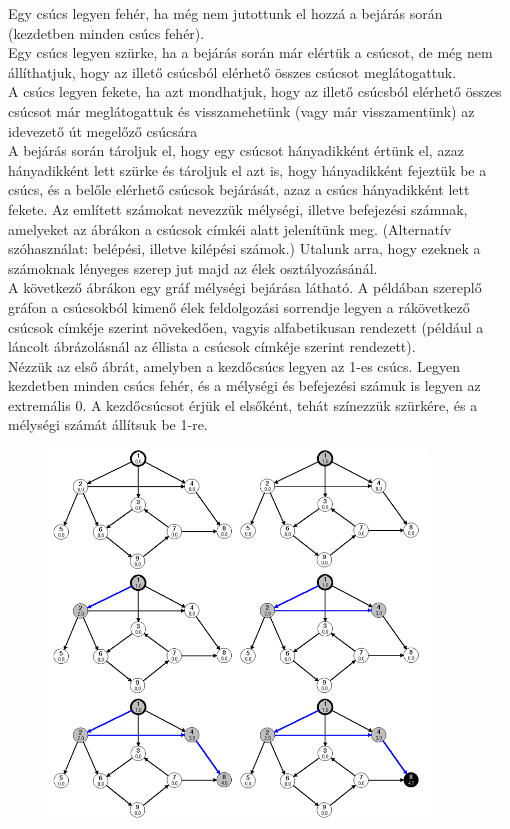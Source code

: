\documentclass[margin=0px]{article}
\begin{document}
    \noindent Egy csúcs legyen fehér, ha még nem jutottunk el hozzá a bejárás során (kezdetben minden csúcs fehér).\\
    \noindent Egy csúcs legyen szürke, ha a bejárás során már elértük a csúcsot, de még nem állíthatjuk, hogy az illető csúcsból elérhető összes csúcsot meglátogattuk.\\
    \noindent A csúcs legyen fekete, ha azt mondhatjuk, hogy az illető csúcsból elérhető összes csúcsot már meglátogattuk és visszamehetünk (vagy már visszamentünk) az idevezető út megelőző csúcsára\\

    \noindent A bejárás során tároljuk el, hogy egy csúcsot hányadikként értünk el, azaz hányadikként lett szürke és tároljuk el azt is, hogy hányadikként fejeztük be a csúcs, és a belőle elérhető csúcsok bejárását, azaz a csúcs hányadikként lett fekete. Az említett számokat nevezzük mélységi, illetve befejezési számnak, amelyeket az ábrákon a csúcsok címkéi alatt jelenítünk meg. (Alternatív szóhasználat: belépési, illetve kilépési számok.) Utalunk arra, hogy ezeknek a számoknak lényeges szerep jut majd az élek osztályozásánál.\\

    \noindent A következő ábrákon egy gráf mélységi bejárása látható. A példában szereplő gráfon a csúcsokból kimenő élek feldolgozási sorrendje legyen a rákövetkező csúcsok címkéje szerint növekedően, vagyis alfabetikusan rendezett (például a láncolt ábrázolásnál az éllista a csúcsok címkéje szerint rendezett).\\

    Nézzük az első ábrát, amelyben a kezdőcsúcs legyen az 1-es csúcs. Legyen kezdetben minden csúcs fehér, és a mélységi és befejezési számuk is legyen az extremális 0. A kezdőcsúcsot érjük el elsőként, tehát színezzük szürkére, és a mélységi számát állítsuk be 1-re.\\

	\begin{figure}[H]
		\centering
		\includegraphics[width=0.9\textwidth]{img/melysegi_1.png}
		\label{fig:melysegi_pelda_1}
	\end{figure}    
\end{document}
